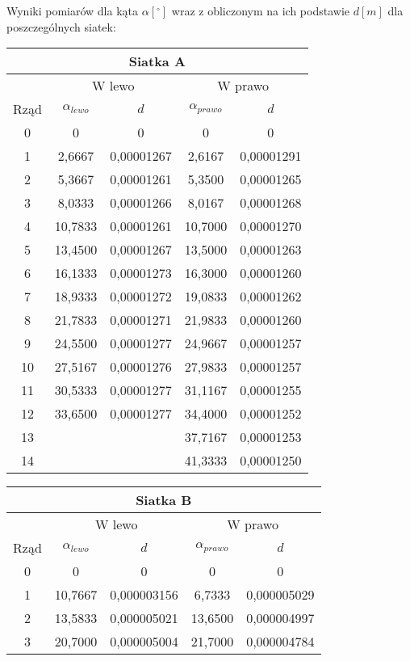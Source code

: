 \documentclass[10pt,a4paper]{article}
\begin{document}
Wyniki pomiarów dla kąta $\alpha[^\circ]$ wraz z obliczonym na ich podstawie $d[m]$ dla poszczególnych siatek:

\begin{center}
\begin{tabular}{|c|c|c|c|c|}
\hline
\multicolumn{5}{|c|}{Siatka A}\\
\hline
& \multicolumn{2}{c}{W lewo} & \multicolumn{2}{|c|}{W prawo}\\
\hline
Rząd & $\alpha_{lewo}$ & $d$ &$\alpha_{prawo}$&$d$\\
\hline
0&0&0&0&0\\ 
\hline
1&2,6667&0,00001267&2,6167&0,00001291\\ 
\hline 
2&5,3667&0,00001261&5,3500&0,00001265\\ 
\hline 
3&8,0333&0,00001266&8,0167&0,00001268\\ 
\hline 
4&10,7833&0,00001261&10,7000&0,00001270\\ 
\hline 
5&13,4500&0,00001267&13,5000&0,00001263\\ 
\hline 
6&16,1333&0,00001273&16,3000&0,00001260\\ 
\hline 
7&18,9333&0,00001272&19,0833&0,00001262\\ 
\hline 
8&21,7833&0,00001271&21,9833&0,00001260\\ 
\hline 
9&24,5500&0,00001277&24,9667&0,00001257\\ 
\hline 
10&27,5167&0,00001276&27,9833&0,00001257\\ 
\hline 
11&30,5333&0,00001277&31,1167&0,00001255\\ 
\hline 
12&33,6500&0,00001277&34,4000&0,00001252\\ 
\hline 
13&&&37,7167&0,00001253\\ 
\hline 
14&&&41,3333&0,00001250\\ 
\hline 
\end{tabular}
\end{center}

\begin{center}
\begin{tabular}{|c|c|c|c|c|}
\hline
\multicolumn{5}{|c|}{Siatka B}\\
\hline
& \multicolumn{2}{c}{W lewo} & \multicolumn{2}{|c|}{W prawo}\\
\hline
Rząd & $\alpha_{lewo}$ & $d$ &$\alpha_{prawo}$&$d$\\
\hline
0&0&0&0&0\\ 
\hline
1&10,7667&0,000003156&6,7333&0,000005029\\ 
\hline 
2&13,5833&0,000005021&13,6500&0,000004997\\ 
\hline 
3&20,7000&0,000005004&21,7000&0,000004784\\ 
\hline 
 
\end{tabular}
\end{center}
\end{document}
